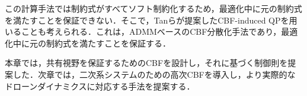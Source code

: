 この計算手法では制約式がすべてソフト制約化するため，最適化中に元の制約式を満たすことを保証できない．そこで，Tanら\cite{Tan2022}が提案したCBF-induced QPを用いることも考えられる．これは，ADMMベースのCBF分散化手法であり，最適化中に元の制約式を満たすことを保証する．

本章では，共有視野を保証するためのCBFを設計し，それに基づく制御則を提案した．次章では，二次系システムのための高次CBFを導入し，より実際的なドローンダイナミクスに対応する手法を提案する．
